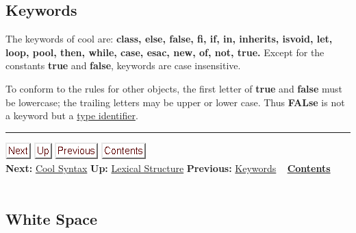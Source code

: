 \documentclass[]{article}
\begin{document}
\subsection{Keywords}

The keywords of cool are: \textbf{class, else, false, fi, if, in,
inherits, isvoid, let, loop, pool, then, while, case, esac, new, of,
not, true.} Except for the constants \textbf{true} and \textbf{false},
keywords are case insensitive.

To conform to the rules for other objects, the first letter of
\textbf{true} and \textbf{false} must be lowercase; the trailing letters
may be upper or lower case. Thus \textbf{FALse} is not a keyword but a
\href{node34.html}{type identifier}.

\begin{center}\rule{3in}{0.4pt}\end{center}

\href{node39.html}{\includegraphics{next.png}}
\href{node33.html}{\includegraphics{up.png}}
\href{node37.html}{\includegraphics{prev.png}}
\href{node1.html}{\includegraphics{contents.png}} \\ \textbf{Next:}
\href{node39.html}{Cool Syntax} \textbf{Up:} \href{node33.html}{Lexical
Structure} \textbf{Previous:} \href{node37.html}{Keywords} ~
\textbf{\href{node1.html}{Contents}} \\ \\

\subsection{White Space}
\end{document}
